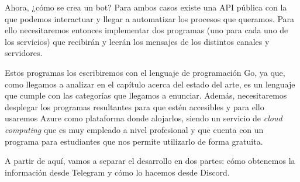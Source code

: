 Ahora, ¿cómo se crea un bot? Para ambos casos existe una API pública con la que 
podemos interactuar y llegar a automatizar los procesos que queramos. Para ello 
necesitaremos entonces implementar dos programas (uno para cada uno de los 
servicios) que recibirán y leerán los mensajes de los distintos canales y 
servidores.

Estos programas los escribiremos con el lenguaje de programación Go, ya que, como 
llegamos a analizar en el capítulo acerca del estado del arte, es un lenguaje que 
cumple con las categorías que llegamos a enunciar. Además, necesitaremos desplegar 
los programas resultantes para que estén accesibles y para ello usaremos Azure 
como plataforma donde alojarlos, siendo un servicio de \textit{cloud computing} 
que es muy empleado a nivel profesional y que cuenta con un programa para 
estudiantes que nos permite utilizarlo de forma gratuita.

A partir de aquí, vamos a separar el desarrollo en dos partes: cómo obtenemos la 
información desde Telegram y cómo lo hacemos desde Discord.
